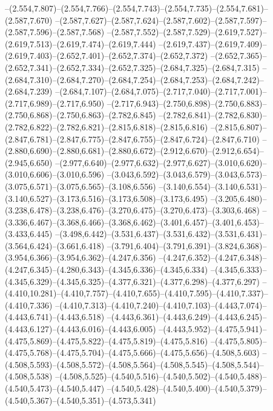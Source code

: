   --(2.554,7.807)--(2.554,7.766)--(2.554,7.743)--(2.554,7.735)--(2.554,7.681)--(2.587,7.670)%
  --(2.587,7.627)--(2.587,7.624)--(2.587,7.602)--(2.587,7.597)--(2.587,7.596)--(2.587,7.568)%
  --(2.587,7.552)--(2.587,7.529)--(2.619,7.527)--(2.619,7.513)--(2.619,7.474)--(2.619,7.444)%
  --(2.619,7.437)--(2.619,7.409)--(2.619,7.403)--(2.652,7.401)--(2.652,7.374)--(2.652,7.372)%
  --(2.652,7.365)--(2.652,7.341)--(2.652,7.334)--(2.652,7.325)--(2.684,7.325)--(2.684,7.315)%
  --(2.684,7.310)--(2.684,7.270)--(2.684,7.254)--(2.684,7.253)--(2.684,7.242)--(2.684,7.239)%
  --(2.684,7.107)--(2.684,7.075)--(2.717,7.040)--(2.717,7.001)--(2.717,6.989)--(2.717,6.950)%
  --(2.717,6.943)--(2.750,6.898)--(2.750,6.883)--(2.750,6.868)--(2.750,6.863)--(2.782,6.845)%
  --(2.782,6.841)--(2.782,6.830)--(2.782,6.822)--(2.782,6.821)--(2.815,6.818)--(2.815,6.816)%
  --(2.815,6.807)--(2.847,6.781)--(2.847,6.775)--(2.847,6.755)--(2.847,6.724)--(2.847,6.710)%
  --(2.880,6.690)--(2.880,6.681)--(2.880,6.672)--(2.912,6.670)--(2.912,6.654)--(2.945,6.650)%
  --(2.977,6.640)--(2.977,6.632)--(2.977,6.627)--(3.010,6.620)--(3.010,6.606)--(3.010,6.596)%
  --(3.043,6.592)--(3.043,6.579)--(3.043,6.573)--(3.075,6.571)--(3.075,6.565)--(3.108,6.556)%
  --(3.140,6.554)--(3.140,6.531)--(3.140,6.527)--(3.173,6.516)--(3.173,6.508)--(3.173,6.495)%
  --(3.205,6.480)--(3.238,6.478)--(3.238,6.476)--(3.270,6.475)--(3.270,6.473)--(3.303,6.468)%
  --(3.336,6.467)--(3.368,6.466)--(3.368,6.462)--(3.401,6.457)--(3.401,6.453)--(3.433,6.445)%
  --(3.498,6.442)--(3.531,6.437)--(3.531,6.432)--(3.531,6.431)--(3.564,6.424)--(3.661,6.418)%
  --(3.791,6.404)--(3.791,6.391)--(3.824,6.368)--(3.954,6.366)--(3.954,6.362)--(4.247,6.356)%
  --(4.247,6.352)--(4.247,6.348)--(4.247,6.345)--(4.280,6.343)--(4.345,6.336)--(4.345,6.334)%
  --(4.345,6.333)--(4.345,6.329)--(4.345,6.325)--(4.377,6.321)--(4.377,6.298)--(4.377,6.297)%
  --(4.410,10.281)--(4.410,7.757)--(4.410,7.655)--(4.410,7.595)--(4.410,7.337)--(4.410,7.336)%
  --(4.410,7.313)--(4.410,7.240)--(4.410,7.103)--(4.443,7.074)--(4.443,6.741)--(4.443,6.518)%
  --(4.443,6.361)--(4.443,6.249)--(4.443,6.245)--(4.443,6.127)--(4.443,6.016)--(4.443,6.005)%
  --(4.443,5.952)--(4.475,5.941)--(4.475,5.869)--(4.475,5.822)--(4.475,5.819)--(4.475,5.816)%
  --(4.475,5.805)--(4.475,5.768)--(4.475,5.704)--(4.475,5.666)--(4.475,5.656)--(4.508,5.603)%
  --(4.508,5.593)--(4.508,5.572)--(4.508,5.564)--(4.508,5.545)--(4.508,5.544)--(4.508,5.538)%
  --(4.508,5.525)--(4.540,5.516)--(4.540,5.502)--(4.540,5.488)--(4.540,5.473)--(4.540,5.447)%
  --(4.540,5.428)--(4.540,5.400)--(4.540,5.379)--(4.540,5.367)--(4.540,5.351)--(4.573,5.341)%
